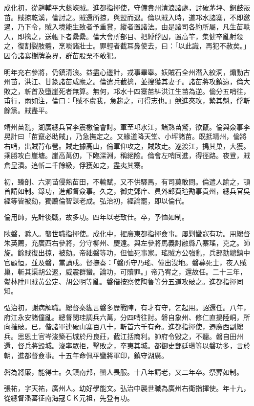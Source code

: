 \begin{pinyinscope}
成化初，從趙輔平大藤峽賊。進都指揮使，守備貴州清浪諸處，討破茅坪、銅鼓叛苗。賊掠乾溪，倫討之。賊還所掠，與盟而退。倫以賊入時，道邛水諸寨，不即邀遏，乃下令，賊入境能生致者予重賞，縱者置諸法。由是諸司各約所屬，凡生苗軼入，即擒之，送帳下者纍纍。倫大會所部目、把縛俘囚，置高竿，集健卒亂射殺之，復割裂肢體，烹啖諸壯士。罪輕者截耳鼻使去，曰：「以此識，再犯不赦矣。」因令諸寨樹牌為界，群苗股栗不敢犯。

明年充右參將，仍鎮清浪。益盡心邊計，戎事畢舉。妖賊石全州潛入絞洞，煽動古州苗，洪江、甘篆諸苗咸應之。倫遣兵截擒，並搜獲其妻子。諸苗將攻鎮遠，倫大敗之，斬首及墮崖死者無算。無何，邛水十四寨苗糾洪江生苗為逆。倫分五哨往，甫行，雨如注，倫曰：「賊不虞我，急趨之，可得志也。」競進夾攻，縶其魁，俘斬餘黨。賊盡平。

靖州苗亂，湖廣總兵官李震檄倫會討。軍至邛水江，諸熟苗驚，欲竄。倫與僉事李晃計曰「苗竄必助賊」，乃急撫定之。又緣道降天堂、小坪諸苗。既抵靖州，倫將右哨，出賊背布營。賊走據高山，倫軍仰攻之，賊敗走。遂渡江，搗其巢，大獲。乘勝攻白崖塘。崖高萬仞，下臨深淵，稱絕險。倫會左哨同進，得徑路。夜登，賊倉皇潰。追斬二千餘級，俘獲如之，盡夷其寨。

初，臻剖、六洞苗侵熟苗田，不輸賦，又不供驛馬，有司莫敢問。倫遣人諭之，頓首請如制。錄功，進都督僉事。久之，御史鄧庠、員外郎費瑄勘事貴州，總兵官吳經等皆被劾，獨薦倫智謀老成。弘治初，經論罷，即以倫代。

倫用師，先計後戰，故多功。四年以老致仕。卒，予恤如制。

歐磐，滁人。襲世職指揮使。成化中，擢廣東都指揮僉事。屢剿蠻寇有功。用總督朱英薦，充廣西右參將，分守柳州、慶遠。與左參將馬義討融縣八寨瑤，克之。師旋。餘賊復出掠，被劾。帝絀磐等功，但恤死事家。瑤賊方公強亂，兵部劾總鎮中官顧恒，並及磐，當謫戍。督撫奏：「磐所守乃瑤、僮出沒地。磐募死士，夜入賊巢，斬其渠胡公返，威震群蠻。論功，可贖罪。」帝乃宥之，還故任。二十三年，鬱林陸川賊黃公定、胡公明等亂。磐偕按察使陶魯等分五道攻破之。進都指揮同知。

弘治初，謝病解職。總督秦紘言磐多歷戰陣，有才有守，乞起用。詔還任。八年，府江永安諸僮亂。總督閔珪調兵六萬，分四哨往討。磐自象州、修仁直搗陸峒，所向摧破。已，偕諸軍連破山寨百八十，斬首六千有奇。進都指揮使，遷廣西副總兵。思恩土官岑浚築石城於丹良莊，截江括商利。帥府令毀之，不聽。磐自田州還，督兵將毀城。浚率眾拒，擊敗之，卒夷其城。都御史鄧廷瓚等以磐功多，言於朝，進都督僉事。十五年命佩平蠻將軍印，鎮守湖廣。

磐為將廉，能得士。久鎮南邦，蠻人畏服。十八年請老，又二年卒。祭葬如制。

張祐，字天祐，廣州人。幼好學能文。弘治中襲世職為廣州右衛指揮使。年十九，從總督潘蕃征南海寇ＣＫ元祖，先登有功。


\end{pinyinscope}

